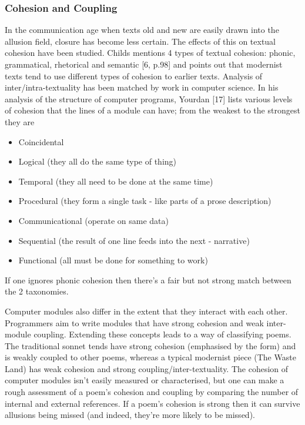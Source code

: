 \documentclass[11pt]{article}
\begin{document}
\subsubsection*{Cohesion and Coupling}

In the communication age when texts old and new are easily drawn into the allusion field, closure has become less certain. The effects of this on textual cohesion have been studied. Childs mentions 4 types of textual cohesion: phonic, grammatical, rhetorical and semantic [6, p.98] and points out that modernist texts tend to use different types of cohesion to earlier texts. Analysis of inter/intra-textuality has been matched by work in computer science. In his analysis of the structure of computer programs, Yourdan [17] lists various levels of cohesion that the lines of a module can have; from the weakest to the strongest they are
\begin{itemize}
 \item   Coincidental
 \item      Logical (they all do the same type of thing)
  \item     Temporal (they all need to be done at the same time)
  \item     Procedural (they form a single task - like parts of a prose description)
  \item     Communicational (operate on same data)
  \item     Sequential (the result of one line feeds into the next - narrative)
  \item     Functional (all must be done for something to work)
\end{itemize}
If one ignores phonic cohesion then there's a fair but not strong match between the 2 taxonomies.

Computer modules also differ in the extent that they interact with each other. Programmers aim to write modules that have strong cohesion and weak inter-module coupling. Extending these concepts leads to a way of classifying poems. The traditional sonnet tends have strong cohesion (emphasised by the form) and is weakly coupled to other poems, whereas a typical modernist piece (The Waste Land) has weak cohesion and strong coupling/inter-textuality. The cohesion of computer modules isn't easily measured or characterised, but one can make a rough assessment of a poem's cohesion and coupling by comparing the number of internal and external references. If a poem's cohesion is strong then it can survive allusions being missed (and indeed, they're more likely to be missed).
\end{document}
